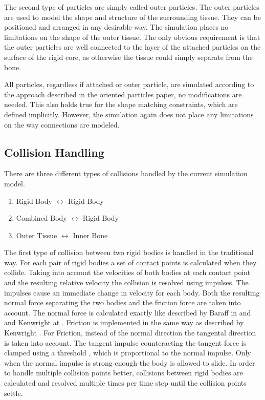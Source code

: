 The second type of particles are simply called outer particles. The outer particles are used to model the shape and structure of the surrounding tissue. They can be positioned and arranged in any desirable way. The simulation places no limitations on the shape of the outer tissue. The only obvious requirement is that the outer particles are well connected to the layer of the attached particles on the surface of the rigid core, as otherwise the tissue could simply separate from the bone.

All particles, regardless if attached or outer particle, are simulated according to the approach described in the oriented particles paper, no modifications are needed. This also holds true for the shape matching constraints, which are defined implicitly. However, the simulation again does not place any limitations on the way connections are modeled.

\subsection{Collision Handling}
\label{subsec:theory_collision_handling}

There are three different types of collisions handled by the current simulation model.

\begin{enumerate}
\item Rigid Body $\leftrightarrow$ Rigid Body
\item Combined Body $\leftrightarrow$ Rigid Body
\item Outer Tissue $\leftrightarrow$ Inner Bone
\end{enumerate}

The first type of collision between two rigid bodies is handled in the traditional way. For each pair of rigid bodies a set of contact points is calculated when they collide. Taking into account the velocities of both bodies at each contact point and the resulting relative velocity the collision is resolved using impulses. The impulses cause an immediate change in velocity for each body. Both the resulting normal force separating the two bodies and the friction force are taken into account. The normal force is calculated exactly like described by Baraff in \cite{Baraff:1997wq} and and Kenwright at \cite{XBDEV}.  Friction is implemented in the same way as described by Kenwright \cite{XBDEV}. For Friction, instead of the normal direction the tangental direction is taken into account. The tangent impulse counteracting the tangent force is clamped using a threshold , which is proportional to the normal impulse. Only when the normal impulse is strong enough the body is allowed to slide. In order to handle multiple collision points better, collisions between rigid bodies are calculated and resolved multiple times per time step until the collision points settle.

